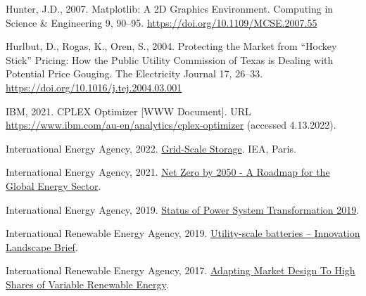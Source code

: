\documentclass[12pt,a4paper,]{report}
\newlength{\cslhangindent}
\newenvironment{CSLReferences}[2] %
 {%
  \setlength{\parindent}{0pt}
  \ifodd #1 \everypar{\setlength{\hangindent}{\cslhangindent}}\ignorespaces\fi
  \ifnum #2 > 0
  \setlength{\parskip}{#2\baselineskip}
  \fi
 }%
 {}
\begin{document}
\begin{CSLReferences}{1}{0}
\leavevmode{}%
Hunter, J.D., 2007. Matplotlib: {A 2D Graphics Environment}. Computing
in Science \& Engineering 9, 90--95.
\url{https://doi.org/10.1109/MCSE.2007.55}

\leavevmode{}%
Hurlbut, D., Rogas, K., Oren, S., 2004. Protecting the {Market} from
{``{Hockey Stick}''} {Pricing}: {How} the {Public Utility Commission} of
{Texas} is {Dealing} with {Potential Price Gouging}. The Electricity
Journal 17, 26--33. \url{https://doi.org/10.1016/j.tej.2004.03.001}

\leavevmode{}%
IBM, 2021. {CPLEX Optimizer} {[}WWW Document{]}. URL
\url{https://www.ibm.com/au-en/analytics/cplex-optimizer} (accessed
4.13.2022).

\leavevmode{}%
International Energy Agency, 2022.
\href{https://www.iea.org/fuels-and-technologies/energy-storage}{Grid-{Scale
Storage}}. {IEA}, {Paris}.

\leavevmode{}%
International Energy Agency, 2021.
\href{https://iea.blob.core.windows.net/assets/deebef5d-0c34-4539-9d0c-10b13d840027/NetZeroby2050-ARoadmapfortheGlobalEnergySector_CORR.pdf}{Net
{Zero} by 2050 - {A Roadmap} for the {Global Energy Sector}}.

\leavevmode{}%
International Energy Agency, 2019.
\href{https://iea.blob.core.windows.net/assets/00dd2818-65f1-426c-8756-9cc0409d89a8/Status_of_Power_System_Transformation_2019.pdf}{Status
of {Power System Transformation} 2019}.

\leavevmode{}%
International Renewable Energy Agency, 2019.
\href{https://www.irena.org/publications/2019/Sep/Utility-scale-batteries}{Utility-scale
batteries -- {Innovation Landscape Brief}}.

\leavevmode{}%
International Renewable Energy Agency, 2017.
\href{http://www.irena.org/publications/2017/May/Adapting-Market-Design-to-High-Shares-of-Variable-Renewable-Energy}{Adapting
{Market Design To High Shares} of {Variable Renewable Energy}}.


\end{CSLReferences}
\end{document}
